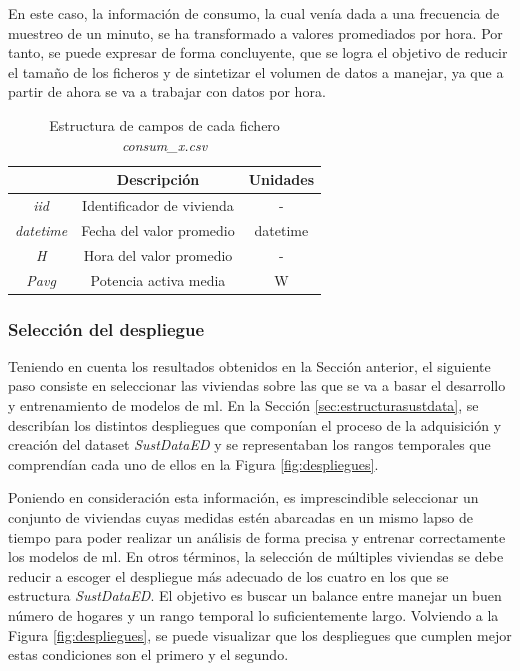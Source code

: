 \vspace{5mm}

En este caso, la información de consumo, la cual venía dada a una frecuencia de muestreo de un minuto, se ha transformado a valores promediados por hora. Por tanto, se puede expresar de forma concluyente, que se logra el objetivo de reducir el tamaño de los ficheros y de sintetizar el volumen de datos a manejar, ya que a partir de ahora se va a trabajar con datos por hora.

\vspace{3mm}

\begin{table}[h!]
  \centering
  \begin{tabular}{|c|c|c|}
  \hline
  \rowcolor[HTML]{AAAAAA} 
  \multicolumn{1}{|c|}{\cellcolor[HTML]{AAAAAA}Campo} & \multicolumn{1}{c|}{\cellcolor[HTML]{AAAAAA}Descripción} & Unidades \\ \hline
  \textit{iid} & Identificador de vivienda & - \\ \hline
  \textit{datetime} & Fecha del valor promedio & datetime \\ \hline
  \textit{H} & Hora del valor promedio & - \\ \hline
  \textit{Pavg} & Potencia activa media & W \\ \hline
  \end{tabular}
  \caption{Estructura de campos de cada fichero \textit{consum\_x.csv}}
  \label{tab:consum}
\end{table}

\pagebreak

\subsubsection{Selección del despliegue}

Teniendo en cuenta los resultados obtenidos en la Sección anterior, el siguiente paso consiste en seleccionar las viviendas sobre las que se va a basar el desarrollo y entrenamiento de modelos de \gls{ml}. En la Sección \ref{sec:estructurasustdata}, se describían los distintos despliegues que componían el proceso de la adquisición y creación del dataset \textit{SustDataED} y se representaban los rangos temporales que comprendían cada uno de ellos en la Figura \ref{fig:despliegues}. 

\vspace{3mm}

Poniendo en consideración esta información, es imprescindible seleccionar un conjunto de viviendas cuyas medidas estén abarcadas en un mismo lapso de tiempo para poder realizar un análisis de forma precisa y entrenar correctamente los modelos de \gls{ml}. En otros términos, la selección de múltiples viviendas se debe reducir a escoger el despliegue más adecuado de los cuatro en los que se estructura \textit{SustDataED}. El objetivo es buscar un balance entre manejar un buen número de hogares y un rango temporal lo suficientemente largo. Volviendo a la Figura \ref{fig:despliegues}, se puede visualizar que los despliegues que cumplen mejor estas condiciones son el primero y el segundo. 

